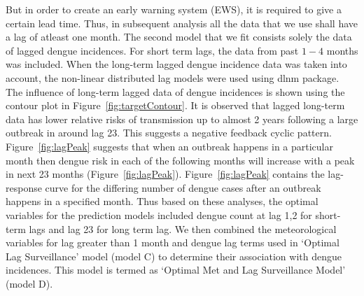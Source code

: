 \documentclass{bmcart}
\begin{document}




But in order to create an early warning system (EWS), it is required to give a certain lead time. Thus, in subsequent analysis all the data that we use shall have a lag of atleast one month. The second model that we fit consists solely the data of lagged dengue incidences. For short term lags, the data from past $1-4$ months was included. When the long-term lagged dengue incidence data was taken into account, the non-linear distributed lag models were used using dlnm package\cite{gasparrini2011distributed}. The influence of long-term lagged data of dengue incidences is shown using the contour plot in Figure~\ref{fig:targetContour}. It is observed that lagged long-term data has lower relative risks of transmission up to almost 2 years following a large outbreak in around lag 23. This suggests a negative feedback cyclic pattern. Figure~\ref{fig:lagPeak} suggests that when an outbreak happens in a particular month then dengue risk in each of the following months will increase with a peak in next 23 months (Figure~\ref{fig:lagPeak}). %
Figure~\ref{fig:lagPeak} contains the lag-response curve for the differing number of dengue cases after an outbreak happens in a specified month. Thus based on these  analyses, the optimal variables for the prediction models included dengue count at lag 1,2 for short-term lags and lag 23 for long term lag. We then combined the meteorological variables for lag greater than 1 month and dengue lag terms used in `Optimal Lag Surveillance' model (model C) to determine their association with dengue incidences. This model is termed as `Optimal Met and Lag Surveillance Model' (model D). 
\end{document}
